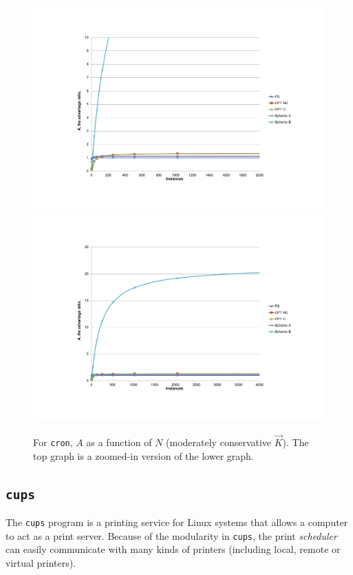 \begin{figure}
  \centering
  \subfloat%
           {\includegraphics[scale=0.75, trim=5cm 3cm 0cm 4.5cm]{cron-2.pdf} \label{cron2}} \\
  \subfloat%
           {\includegraphics[scale=0.75, trim=5cm 3cm 0cm 3cm]{cron-3.pdf} \label{cron3}} 
  \caption[For \texttt{cron}, $A$ as a function of $N$ (moderately conservative $\vec K$)]%
          {For \texttt{cron}, $A$ as a function of $N$ (moderately conservative $\vec K$).
          The top graph is a zoomed-in version of the lower graph.}
  \label{cron23}
\end{figure}

\newpage
\subsection{\texttt{cups}} \label{cups:hard}
The \texttt{cups} program is a printing service
for Linux systems that allows a computer to act as a print server. 
Because of the modularity in \texttt{cups}, the print {\em scheduler}
can easily communicate with many kinds of printers (including local, remote or
virtual printers).

